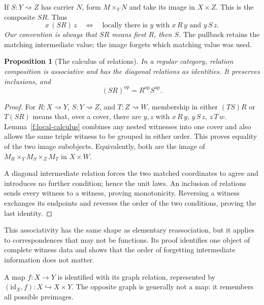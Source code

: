 \documentclass[11pt]{article}
\newtheorem{proposition}[theorem]{Proposition}
\theoremstyle{definition}
\theoremstyle{remark}\newtheorem{remark}[theorem]{Remark}
\newcommand{\id}{\mathrm{id}}
\begin{document}
If $S:Y\rightsquigarrow Z$ has carrier $N$, form $M\times_YN$ and take
its image in $X\times Z$. This is the composite $SR$. Thus
\[
x\,(SR)\,z
\quad\Longleftrightarrow\quad
\text{locally there is }y\text{ with }x\,R\,y\text{ and }y\,S\,z.
\]
\emph{Our convention is always that $SR$ means first $R$, then $S$.}
The pullback retains the matching intermediate value; the image forgets
which matching value was used.

\begin{proposition}[The calculus of relations]\label{f:relation-calculus}
In a regular category, relation composition is associative and has
the diagonal relations as identities. It preserves inclusions, and
\[
(SR)^{\mathrm{op}}=R^{\mathrm{op}}S^{\mathrm{op}}.
\]
\end{proposition}
\begin{proof}
For $R:X\rightsquigarrow Y$, $S:Y\rightsquigarrow Z$, and
$T:Z\rightsquigarrow W$, membership in either $(TS)R$ or $T(SR)$
means that, over a cover, there are $y,z$ with
$x\,R\,y$, $y\,S\,z$, $z\,T\,w$. Lemma~\ref{f:local-calculus}
combines any nested witnesses into one cover and also allows the same
triple witness to be grouped in either order. This proves equality of
the two image subobjects. Equivalently, both are the image of
$M_R\times_YM_S\times_ZM_T$ in $X\times W$.

A diagonal intermediate relation forces the two matched coordinates
to agree and introduces no further condition; hence the unit laws.
An inclusion of relations sends every witness to a witness, proving
monotonicity. Reversing a witness exchanges its endpoints and reverses
the order of the two conditions, proving the last identity.
\end{proof}

This associativity has the same shape as elementary reassociation, but
it applies to correspondences that may not be functions. Its proof
identifies one object of complete witness data and shows that the order
of forgetting intermediate information does not matter.

A map $f:X\to Y$ is identified with its graph relation, represented by
$(\id_X,f):X\hookrightarrow X\times Y$. The opposite graph is generally
not a map: it remembers all possible preimages.
\end{document}
